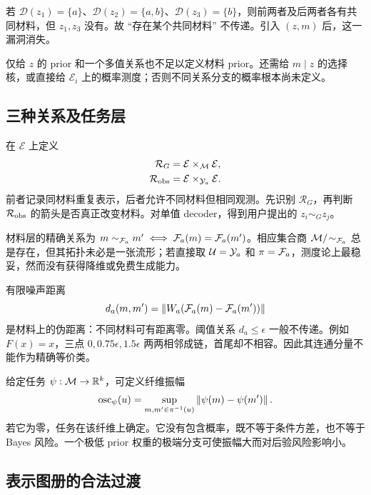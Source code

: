\begin{example}
若 $\mathcal D(z_1)=\{a\}$、$\mathcal D(z_2)=\{a,b\}$、$\mathcal D(z_3)=\{b\}$，则前两者及后两者各有共同材料，但 $z_1,z_3$ 没有。故 ``存在某个共同材料'' 不传递。引入 $(z,m)$ 后，这一漏洞消失。
\end{example}

仅给 $z$ 的 prior 和一个多值关系也不足以定义材料 prior。还需给 $m\mid z$ 的选择核，或直接给 $\mathcal E_i$ 上的概率测度；否则不同关系分支的概率根本尚未定义。

\subsection{三种关系及任务层}

在 $\mathcal E$ 上定义
\begin{align}
\mathcal R_G&=\mathcal E\times_{\mathcal M}\mathcal E,\\
\mathcal R_{\rm obs}&=\mathcal E\times_{\mathcal Y_a}\mathcal E.
\end{align}
前者记录同材料重复表示，后者允许不同材料但相同观测。先识别 $\mathcal R_G$，再判断 $\mathcal R_{\rm obs}$ 的箭头是否真正改变材料。对单值 decoder，得到用户提出的 $z_i\sim_Gz_j$。

材料层的精确关系为 $m\sim_{{\mathcal F_a}}m'\iff{\mathcal F_a}(m)={\mathcal F_a}(m')$。相应集合商 $\mathcal M/\!\sim_{\mathcal F_a}$ 总是存在，但其拓扑未必是一张流形；若直接取 $\mathcal U=\mathcal Y_a$ 和 $\pi={\mathcal F_a}$，测度论上最稳妥，然而没有获得降维或免费生成能力。

有限噪声距离
\begin{equation}
d_a(m,m')=\left\lVert W_a({\mathcal F_a}(m)-{\mathcal F_a}(m'))\right\rVert
\end{equation}
是材料上的伪距离：不同材料可有距离零。阈值关系 $d_a\le\epsilon$ 一般不传递。例如 $F(x)=x$，三点 $0,0.75\epsilon,1.5\epsilon$ 两两相邻成链，首尾却不相容。因此其连通分量不能作为精确等价类。

给定任务 $\psi:\mathcal M\to\mathbb R^k$，可定义纤维振幅
\begin{equation}
\operatorname{osc}_\psi(u)
=\sup_{m,m'\in\pi^{-1}(u)}\left\lVert \psi(m)-\psi(m')\right\rVert.
\end{equation}
若它为零，任务在该纤维上确定。它没有包含概率，既不等于条件方差，也不等于 Bayes 风险。一个极低 prior 权重的极端分支可使振幅大而对后验风险影响小。

\subsection{表示图册的合法过渡}

